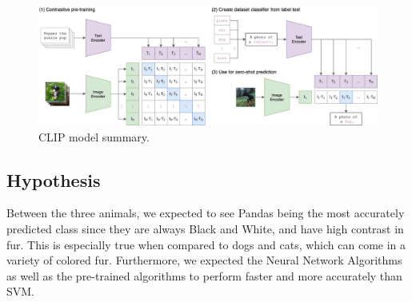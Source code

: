 \begin{figure}[h]
	\centering
	\includegraphics[scale=0.5]{CLIP_structure}
	\caption{CLIP model summary.}
	\label{fig:figure3}
\end{figure}

\subsection{Hypothesis}
Between the three animals, we expected to see Pandas being the most accurately predicted class since they are always Black and White, and have high contrast in fur.
This is especially true when compared to dogs and cats, which can come in a variety of colored fur.
Furthermore, we expected the Neural Network Algorithms as well as the pre-trained algorithms to perform faster and more accurately than SVM.